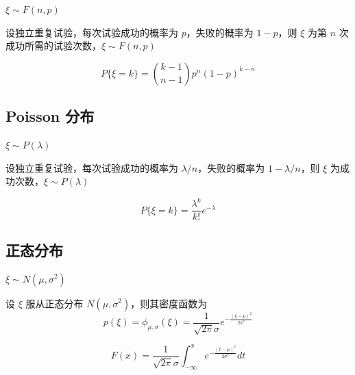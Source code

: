 \documentclass[12pt,a4paper]{amsart}
\begin{document}
$\xi\sim F(n,p)$

\begin{definition}[Pascal 分布]
    设独立重复试验，每次试验成功的概率为 $p$，失败的概率为 $1-p$，则 $\xi$ 为第 $n$ 次成功所需的试验次数，$\xi\sim F(n,p)$
\end{definition}

\begin{proposition}
    \begin{equation}
        P\{\xi=k\} = \binom{k-1}{n-1}p^n(1-p)^{k-n}
    \end{equation}
\end{proposition}

\subsection{Poisson 分布}

$\xi\sim P(\lambda)$

\begin{definition}[Poisson 分布]
    设独立重复试验，每次试验成功的概率为 $\lambda/n$，失败的概率为 $1-\lambda/n$，则 $\xi$ 为成功次数，$\xi\sim P(\lambda)$
\end{definition}

\begin{proposition}
    \begin{equation}
        P\{\xi=k\} = \frac{\lambda^k}{k!}e^{-\lambda}
    \end{equation}
\end{proposition}

\subsection{正态分布}

$\xi\sim N(\mu, \sigma^2)$

\begin{definition}[正态分布]
    设 $\xi$ 服从正态分布 $N(\mu, \sigma^2)$，则其密度函数为
    \begin{equation}
        p(\xi) = \phi_{\mu,\sigma} (\xi) = \frac{1}{\sqrt{2\pi}\sigma}e^{-\frac{(\xi-\mu)^2}{2\sigma^2}}
    \end{equation}
\end{definition}

\begin{proposition}[正态分布的分布函数]
    \begin{equation}
        F(x) = \frac{1}{\sqrt{2\pi}\sigma}\int_{-\infty}^{x}e^{-\frac{(t-\mu)^2}{2\sigma^2}}dt
    \end{equation}
\end{proposition}
\end{document}
